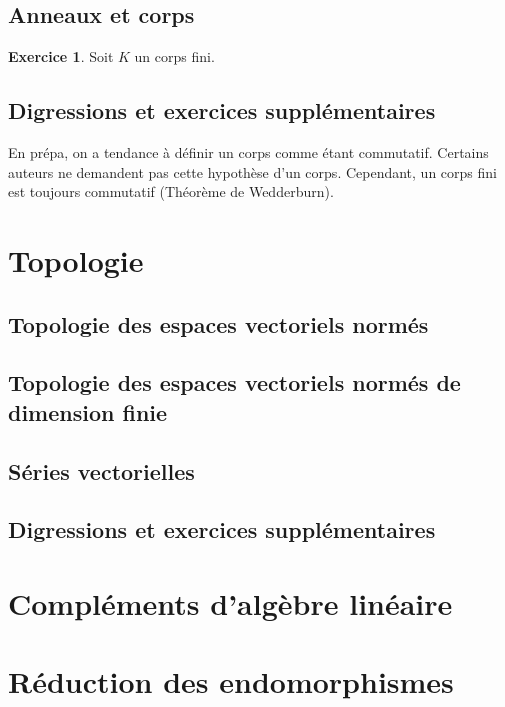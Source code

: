 \documentclass[12pt,a4paper]{book}
\theoremstyle{definition}
\newtheorem{exo}{Exercice}[section]
\theoremstyle{remark}
\begin{document}
\section{Anneaux et corps}

\begin{exo}
    Soit $K$ un corps fini.
\end{exo}

\section{Digressions et exercices supplémentaires}

En prépa, on a tendance à définir un corps comme étant commutatif. Certains auteurs ne demandent pas cette hypothèse d'un corps. Cependant, un corps fini est toujours commutatif (Théorème de Wedderburn).



\chapter{Topologie}

\section{Topologie des espaces vectoriels normés}

\section{Topologie des espaces vectoriels normés de dimension finie}

\section{Séries vectorielles}

\section{Digressions et exercices supplémentaires}


\chapter{Compléments d'algèbre linéaire}

\chapter{Réduction des endomorphismes}
\end{document}
